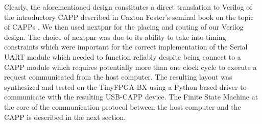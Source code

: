 Clearly, the aforementioned design constitutes a direct translation to Verilog of the introductory CAPP described in Caxton Foster's seminal book on the topic of CAPPs \cite{capp}.
We then used nextpnr for the placing and routing of our Verilog design. The choice of nextpnr was due to its ability to take into timing constraints which were important for the correct implementation of the Serial UART module which needed to function reliably despite being connect to a CAPP module which requires potentially more than one clock cycle to execute a request communicated from the host computer. The resulting layout was synthesized and tested on the TinyFPGA-BX using a Python-based driver to communicate with the resulting USB-CAPP device.
The Finite State Machine at the core of the communication protocol between the host computer and the CAPP is described in the next section.
